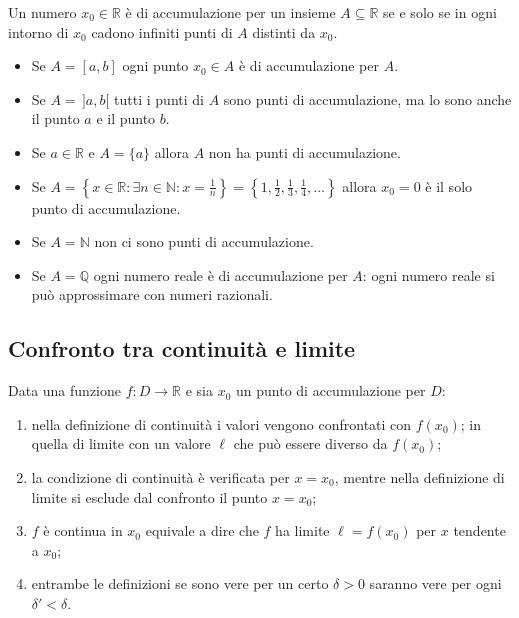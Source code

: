 \documentclass[11pt,a4paper]{article}
\begin{document}
\begin{proposizione}
Un numero $x_0 \in \mathbb{R}$ è di accumulazione per un insieme $A \subseteq \mathbb{R}$ se e solo se in ogni intorno di $x_0$ cadono infiniti punti di $A$ distinti da $x_0$.
\end{proposizione}

\begin{esempio}
\begin{itemize}
    \item Se $A = [a, b]$ ogni punto $x_0 \in A$ è di accumulazione per $A$.
    \item Se $A = \,]a, b[$ tutti i punti di $A$ sono punti di accumulazione, ma lo sono anche il punto $a$ e il punto $b$.
    \item Se $a \in \mathbb{R}$ e $A = \{a\}$ allora $A$ non ha punti di accumulazione.
    \item Se $A = \left\{ x \in \mathbb{R} : \exists n \in \mathbb{N} : x = \tfrac{1}{n} \right\} = \left\{1, \tfrac{1}{2}, \tfrac{1}{3}, \tfrac{1}{4}, \dots \right\}$ allora $x_0 = 0$ è il solo punto di accumulazione.
    \item Se $A = \mathbb{N}$ non ci sono punti di accumulazione.
    \item Se $A = \mathbb{Q}$ ogni numero reale è di accumulazione per $A$: ogni numero reale si può approssimare con numeri razionali.
\end{itemize}
\end{esempio}

\subsection{Confronto tra continuità e limite}

Data una funzione $f : D \to \mathbb{R}$ e sia $x_0$ un punto di accumulazione per $D$:
\begin{enumerate}
    \item nella definizione di continuità i valori vengono confrontati con $f(x_0)$; in quella di limite con un valore $\ell$ che può essere diverso da $f(x_0)$;
    \item la condizione di continuità è verificata per $x = x_0$, mentre nella definizione di limite si esclude dal confronto il punto $x = x_0$;
    \item $f$ è continua in $x_0$ equivale a dire che $f$ ha limite $\ell = f(x_0)$ per $x$ tendente a $x_0$;
    \item entrambe le definizioni se sono vere per un certo $\delta > 0$ saranno vere per ogni $\delta' < \delta$.
\end{enumerate}
\end{document}
